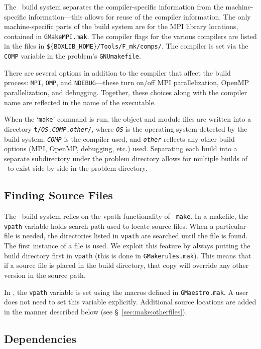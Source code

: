 The \boxlib\ build system separates the compiler-specific information
from the machine-specific information---this allows for reuse of the
compiler information.  The only machine-specific parts of the build system
are for the MPI library locations, contained in {\tt GMakeMPI.mak}.
The compiler flags for the various compilers are listed in the
files in {\tt \$\{BOXLIB\_HOME\}/Tools/F\_mk/comps/}.  The compiler
is set via the {\tt COMP} variable in the problem's {\tt GNUmakefile}.

There are several options in addition to the compiler that affect the
build process: {\tt MPI}, {\tt OMP}, and {\tt NDEBUG}---these turn on/off
MPI parallelization, OpenMP parallelization, and debugging.  Together,
these choices along with the compiler name are reflected in the name
of the executable.  

When the `{\tt make}' command is run, the object and module files are
written into a directory {\tt t/{\em OS}.{\em COMP}.{\em other}/},
where {\tt \em OS} is the operating system detected by the build
system, {\tt \em COMP} is the compiler used, and {\tt \em other}
reflects any other build options (MPI, OpenMP, debugging, etc.) used.
Separating each build into a separate subdirectory under the problem
directory allows for multiple builds of \maestro\ to exist
side-by-side in the problem directory.

\subsection{Finding Source Files}

The \boxlib\ build system relies on the vpath functionality of {\tt
make}.  In a makefile, the {\tt vpath} variable holds search path used
to locate source files.  When a particular file is needed, the
directories listed in {\tt vpath} are searched until the file is
found.  The first instance of a file is used.  We exploit this feature
by always putting the build directory first in {\tt vpath} (this is
done in {\tt GMakerules.mak}).  This means that if a source file is
placed in the build directory, that copy will override any other
version in the source path.

In \maestro, the {\tt vpath} variable is set using the macros defined
in {\tt GMaestro.mak}.  A user does not need to set this variable
explicitly.  Additional source locations are added in the manner
described below (see \S~\ref{sec:make:otherfiles}).

\subsection{Dependencies}

